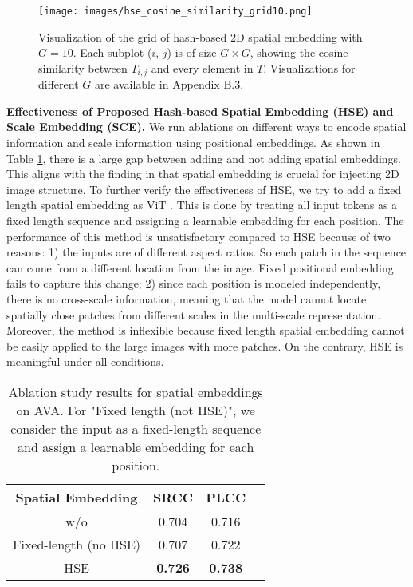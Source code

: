\begin{figure}[!tp]
\centering
\texttt{[image: images/hse\_cosine\_similarity\_grid10.png]}\vspace{-0.5mm}
\caption{Visualization of the grid of hash-based 2D spatial embedding with $G=10$. Each subplot ($i$, $j$) is of size $G\times G$, showing the cosine similarity between $T_{i,j}$ and every element in $T$. Visualizations for different $G$ are available in Appendix B.3.  }\vspace{-3mm}
\label{fig:hse_cosine_similarity_grid10} 
\end{figure}

\vspace{+1.5mm}
\noindent\textbf{Effectiveness of Proposed Hash-based Spatial Embedding (HSE) and Scale Embedding (SCE).} We run ablations on different ways to encode spatial information and scale information using positional embeddings. As shown in Table \ref{tab:spatial-emb}, there is a large gap between adding and not adding spatial embeddings. This aligns with the finding in \cite{dosovitskiy2020} that spatial embedding is crucial for injecting 2D image structure. To further verify the effectiveness of HSE, we try to add a fixed length spatial embedding as ViT \cite{dosovitskiy2020}. This is done by treating all input tokens as a fixed length sequence and assigning a learnable embedding for each position. The performance of this method is unsatisfactory compared to HSE because of two reasons: 1) the inputs are of different aspect ratios. So each patch in the sequence can come from a different location from the image. Fixed positional embedding fails to capture this change; 2) since each position is modeled independently, there is no cross-scale information, meaning that the model cannot locate spatially close patches from different scales in the multi-scale representation. Moreover, the method is inflexible because fixed length spatial embedding cannot be easily applied to the large images with more patches. On the contrary, HSE is meaningful under all conditions.


\begin{table}[!tp]
\footnotesize
\begin{center}
\begin{tabular}{cccc}\toprule
Spatial Embedding &SRCC &PLCC \\\midrule
w/o &0.704 &0.716 \\
Fixed-length (no HSE) &0.707 &0.722 \\
HSE &\textbf{0.726} &\textbf{0.738} \\
\bottomrule
\end{tabular}
\end{center}
\vspace{-2mm}
\caption{Ablation study results for spatial embeddings on AVA. For "Fixed length (not HSE)", we consider the input as a fixed-length sequence and assign a learnable embedding for each position.}\label{tab:spatial-emb}
\vspace{-1mm}
\end{table}

